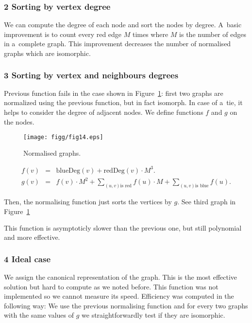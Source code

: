 \subsubsection{2 Sorting by vertex degree} \label{norm1}

We can compute the degree of each node and sort the nodes by degree. A~basic improvement
is to count every red edge $M$ times where $M$ is the number of edges in a~complete
graph. This improvement decreases the number of normalised graphs which are isomorphic.

\subsubsection{3 Sorting by vertex and neighbours degrees} \label{norm2}

Previous function fails in the case shown in Figure~\ref{ctrnact}: first two graphs are normalized
using the previous function, but in fact isomorph. In case of a~tie, it helps to
consider the degree of adjacent nodes. We define functions $f$ and $g$ on the  nodes.

\begin{figure}
	\centerline{\mbox{\texttt{[image: figg/fig14.eps]}}}
	\caption{Normalised graphs.}
	\label{ctrnact}
\end{figure}

\begin{eqnarray*} 
f(v) &=& \mbox{blueDeg}(v) + \mbox{redDeg}(v) \cdot M^3. \\
g(v) &=& f(v) \cdot M^2 + \sum_{(u,v) \mbox{is red}}{f(u) \cdot M} + \sum_{(u,v) \mbox{is blue}}{f(u)}.
\end{eqnarray*}

Then, the normalising function just sorts the vertices by $g$. See third graph
in Figure~\ref{ctrnact}

This function is asymptoticly slower than the previous one, but still polynomial
and more effective.

\subsubsection{4 Ideal case} 
We assign the canonical representation of the graph.
This is the most effective solution but hard to compute as we noted before.
This function was not implemented so we cannot measure its speed.
Efficiency was computed in the following way: We use the previous normalising function
and for every two graphs with the same values of $g$ we straightforwardly test 
if they are isomorphic. 

